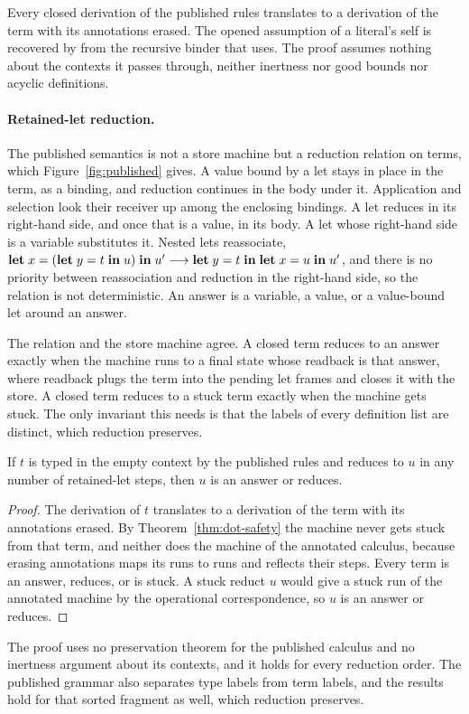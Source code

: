  Every closed derivation of the published rules translates to a \DOTMNF derivation of the term with its annotations erased. The opened assumption of a literal's self is recovered by  from the recursive binder that \DOTMNF uses. The proof assumes nothing about the contexts it passes through, neither inertness nor good bounds nor acyclic definitions.

\paragraph{Retained-let reduction.}
The published semantics is not a store machine but a reduction relation on terms, which Figure~\ref{fig:published} gives. A value bound by a let stays in place in the term, as a binding, and reduction continues in the body under it. Application and selection look their receiver up among the enclosing bindings. A let reduces in its right-hand side, and once that is a value, in its body. A let whose right-hand side is a variable substitutes it. Nested lets reassociate, $\mathbf{let}\; x = (\mathbf{let}\; y = t \;\mathbf{in}\; u) \;\mathbf{in}\; u' \longrightarrow \mathbf{let}\; y = t \;\mathbf{in}\; \mathbf{let}\; x = u \;\mathbf{in}\; u'$, and there is no priority between reassociation and reduction in the right-hand side, so the relation is not deterministic. An answer is a variable, a value, or a value-bound let around an answer.

The relation and the store machine agree. A closed term reduces to an answer exactly when the machine runs to a final state whose readback is that answer, where readback plugs the term into the pending let frames and closes it with the store. A closed term reduces to a stuck term exactly when the machine gets stuck. The only invariant this needs is that the labels of every definition list are distinct, which reduction preserves.

\begin{theorem}\label{thm:wf-safety}
If $t$ is typed in the empty context by the published rules and reduces to $u$ in any number of retained-let steps, then $u$ is an answer or reduces.
\end{theorem}

\begin{proof}
The derivation of $t$ translates to a \DOTMNF derivation of the term with its annotations erased. By Theorem~\ref{thm:dot-safety} the \DOTMNF machine never gets stuck from that term, and neither does the machine of the annotated calculus, because erasing annotations maps its runs to \DOTMNF runs and reflects their steps. Every term is an answer, reduces, or is stuck. A stuck reduct $u$ would give a stuck run of the annotated machine by the operational correspondence, so $u$ is an answer or reduces.
\end{proof}

The proof uses no preservation theorem for the published calculus and no inertness argument about its contexts, and it holds for every reduction order. The published grammar also separates type labels from term labels, and the results hold for that sorted fragment as well, which reduction preserves.
